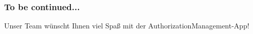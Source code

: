 \documentclass{beamer}
\begin{document}
\begin{frame}
\frametitle{To be continued...}
	

 \begin{center}
	Unser Team wünscht Ihnen viel Spaß mit der AuthorizationManagement-App!
	\end{center}
	
\end{frame}

\end{document}
